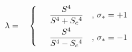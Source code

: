 \begin{equation}
\label{e4:26_2}
\lambda=\quad\left\{\quad \begin{array}{c}\displaystyle \frac{S^4}{S^4+S_c{}^4} \quad\mbox {{\rm , $\sigma_{\ast}=+1$}} \\[3 mm] \displaystyle \frac{S^4}{S^4-S_c{}^4} \quad\mbox {{\rm , $\sigma_{\ast}=-1$}} \end{array} \right.  
\end{equation}

